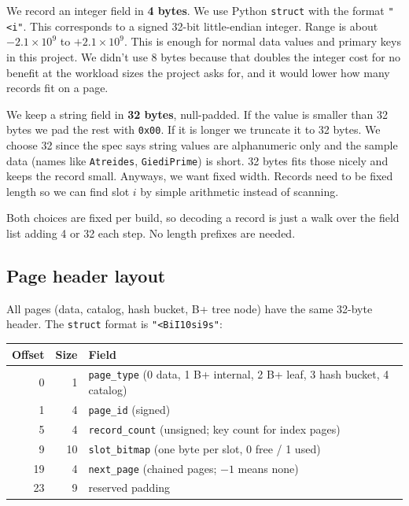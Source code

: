 \documentclass[12pt]{article}
\begin{document}
We record an integer field in \textbf{4 bytes}. We use Python
\texttt{struct} with the format \texttt{"<i"}. This corresponds to a signed 32-bit
little-endian integer. Range is about $-2.1\times10^{9}$ to
$+2.1\times10^{9}$. This is enough for normal data values and primary keys
in this project. We didn't use 8 bytes because that doubles the
integer cost for no benefit at the workload sizes the project asks for, and
it would lower how many records fit on a page.

We keep a string field in \textbf{32 bytes}, null-padded. If the value is
smaller than 32 bytes we pad the rest with \texttt{0x00}. If it is longer
we truncate it to 32 bytes. We choose 32 since the spec says string values are
alphanumeric only and the sample data (names like \texttt{Atreides},
\texttt{GiediPrime}) is short. 32 bytes fits those nicely and keeps the record small. Anyways, we want fixed width. Records
need to be fixed length so we can find slot $i$ by simple arithmetic instead of
scanning.

Both choices are fixed per build, so decoding a record is just a walk over
the field list adding 4 or 32 each step. No length prefixes are needed.

\subsection{Page header layout}

All pages (data, catalog, hash bucket, B+ tree node) have the same
32-byte header. The \texttt{struct} format is \texttt{"<BiI10si9s"}:

\begin{center}
\begin{tabular}{@{}rrl@{}}
\toprule
Offset & Size & Field \\
\midrule
0  & 1  & \texttt{page\_type} (0 data, 1 B+ internal, 2 B+ leaf, 3 hash bucket, 4 catalog) \\
1  & 4  & \texttt{page\_id} (signed) \\
5  & 4  & \texttt{record\_count} (unsigned; key count for index pages) \\
9  & 10 & \texttt{slot\_bitmap} (one byte per slot, 0 free / 1 used) \\
19 & 4  & \texttt{next\_page} (chained pages; $-1$ means none) \\
23 & 9  & reserved padding \\
\bottomrule
\end{tabular}
\end{center}
\end{document}
